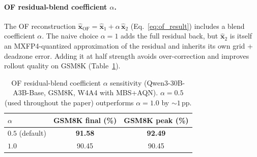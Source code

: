 \documentclass{article}
\theoremstyle{definition}
\theoremstyle{remark}
\newcommand{\bx}{\bm{x}}
\begin{document}
\paragraph{OF residual-blend coefficient $\alpha$.}
\label{app:of_alpha}
The OF reconstruction $\hat{\bx}_{\mathrm{OF}} = \hat{\bx}_1 + \alpha\,\hat{\bx}_2$ (Eq.~\ref{eq:of_result}) includes a blend coefficient $\alpha$. The naive choice $\alpha=1$ adds the full residual back, but $\hat{\bx}_2$ is itself an MXFP4-quantized approximation of the residual and inherits its own grid + deadzone error. Adding it at half strength avoids over-correction and improves rollout quality on GSM8K (Table~\ref{tab:of_alpha}).
\begin{table}[h]
  \caption{OF residual-blend coefficient $\alpha$ sensitivity (Qwen3-30B-A3B-Base, GSM8K, W4A4 with MBS+AQN). $\alpha=0.5$ (used throughout the paper) outperforms $\alpha=1.0$ by ${\sim}1$\,pp.}
  \label{tab:of_alpha}
  \centering
  \small
  \begin{tabular}{lcc}
    \toprule
    $\alpha$ & GSM8K final (\%) & GSM8K peak (\%) \\
    \midrule
    $0.5$ (default)   & \textbf{91.58} & \textbf{92.49} \\
    $1.0$             & 90.45 & 90.45 \\
    \bottomrule
  \end{tabular}
\end{table}
\end{document}
